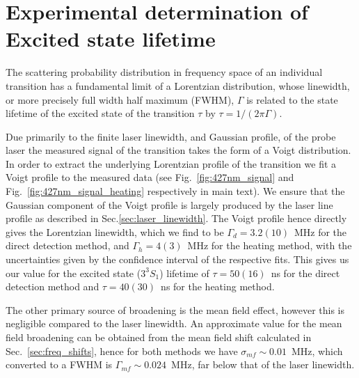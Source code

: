 \documentclass[%
 amsmath,amssymb,
aps,
]{revtex4-2}
\newcommand{\UpperState}{3^{3\!}S_1}%
\begin{document}
\section{Experimental determination of Excited state lifetime}

The scattering probability distribution in frequency space of an individual transition has a fundamental limit of a Lorentzian distribution, whose linewidth, or more precisely full width half maximum (FWHM), \(\Gamma\) is related to the state lifetime of the excited state of the transition \(\tau\) by \(\tau = 1/(2\pi \Gamma)\). 

Due primarily to the finite laser linewidth, and Gaussian profile, of the probe laser the measured signal of the transition takes the form of a Voigt distribution. In order to extract the underlying Lorentzian profile of the transition we fit a Voigt profile to the measured data (see Fig.~\ref{fig:427nm_signal} and Fig.~\ref{fig:427nm_signal_heating} respectively in main text). We ensure that the Gaussian component of the Voigt profile is largely produced by the laser line profile as described in Sec.\ref{sec:laser_linewidth}. The Voigt profile hence directly gives the Lorentzian linewidth, which we find to be \(\Gamma_d = 3.2(10)\)~MHz for the direct detection method, and \(\Gamma_h=4(3)\)~MHz for the heating method, with the uncertainties given by the confidence interval of the respective fits. This gives us our value for the excited state (\(\UpperState\)) lifetime of \(\tau = 50(16)\)~ns for the direct detection method and \(\tau = 40(30)\)~ns for the heating method.

The other primary source of broadening is the mean field effect, however this is negligible compared to the laser linewidth. An approximate value for the mean field broadening can be obtained from the mean field shift calculated in Sec.~\ref{sec:freq_shifts}, hence for both methods we have \(\sigma_{mf} \sim 0.01\)~MHz, which converted to a FWHM is \(\Gamma_{mf} \sim 0.024\)~MHz, far below that of the laser linewidth.

\end{document}
